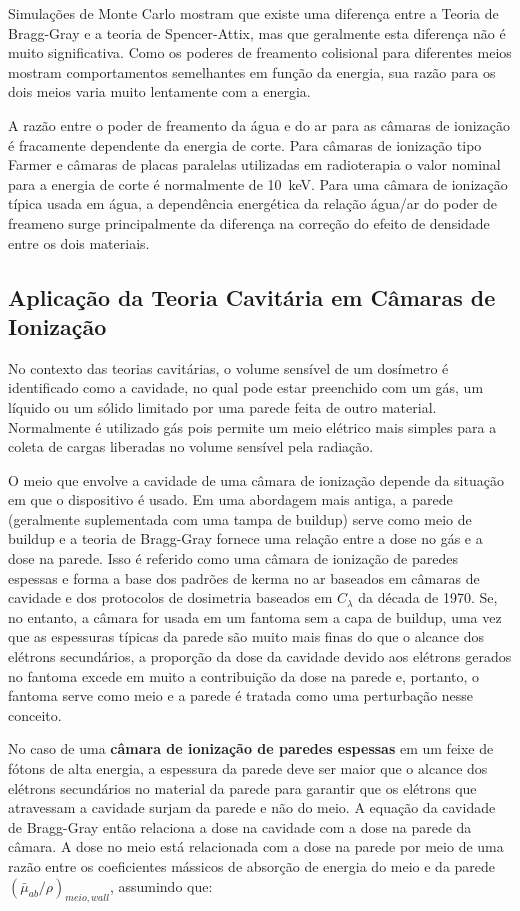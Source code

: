 \documentclass[11pt,a4paper]{article}
\begin{document}
			Simulações de Monte Carlo mostram que existe uma diferença entre a Teoria de Bragg-Gray e a teoria de Spencer-Attix, mas que geralmente esta diferença não é muito significativa. Como os poderes de freamento colisional para diferentes meios mostram comportamentos semelhantes em função da energia, sua razão para os dois meios varia muito lentamente com a energia. 

			A razão entre o poder de freamento da água e do ar para as câmaras de ionização é fracamente dependente da energia de corte. Para câmaras de ionização tipo Farmer e câmaras de placas paralelas utilizadas em radioterapia o valor nominal para a energia de corte é normalmente de \qty{10}{keV}. Para uma câmara de ionização típica usada em água, a dependência energética da relação água/ar do poder de freameno surge principalmente da diferença na correção do efeito de densidade entre os dois materiais.


		\subsection{Aplicação da Teoria Cavitária em Câmaras de Ionização}

			No contexto das teorias cavitárias, o volume sensível de um dosímetro é identificado como a cavidade, no qual pode estar preenchido com um gás, um líquido ou um sólido limitado por uma parede feita de outro material. Normalmente é utilizado gás pois permite um meio elétrico mais simples para a coleta de cargas liberadas no volume sensível pela radiação. 

			O meio que envolve a cavidade de uma câmara de ionização depende da situação em que o dispositivo é usado. Em uma abordagem mais antiga, a parede (geralmente suplementada com uma tampa de buildup) serve como meio de buildup e a teoria de Bragg-Gray fornece uma relação entre a dose no gás e a dose na parede. Isso é referido como uma câmara de ionização de paredes espessas e forma a base dos padrões de kerma no ar baseados em câmaras de cavidade e dos protocolos de dosimetria baseados em $C_\lambda$ da década de 1970. Se, no entanto, a câmara for usada em um fantoma sem a capa de buildup, uma vez que as espessuras típicas da parede são muito mais finas do que o alcance dos elétrons secundários, a proporção da dose da cavidade devido aos elétrons gerados no fantoma excede em muito a contribuição da dose na parede e, portanto, o fantoma serve como meio e a parede é tratada como uma perturbação nesse conceito.

			No caso de uma \textbf{\textcolor{CarnationPink}{câmara de ionização de paredes espessas}} em um feixe de fótons de alta energia, a espessura da parede deve ser maior que o alcance dos elétrons secundários no material da parede para garantir que os elétrons que atravessam a cavidade surjam da parede e não do meio. A equação da cavidade de Bragg-Gray então relaciona a dose na cavidade com a dose na parede da câmara. A dose no meio está relacionada com a dose na parede por meio de uma razão entre os coeficientes mássicos de absorção de energia do meio e da parede $(\bar{\mu}_{ab}/\rho)_{meio, wall}$, assumindo que:
\end{document}
